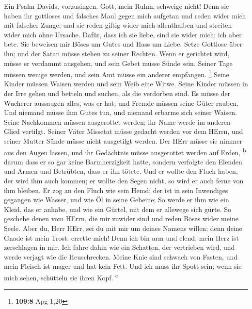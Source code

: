  Ein Psalm Davids, vorzusingen. Gott, mein Ruhm, schweige
nicht!  Denn sie haben ihr gottloses und falsches Maul
gegen mich aufgetan und reden wider mich mit falscher Zunge;
 und sie reden giftig wider mich allenthalben und streiten
wider mich ohne Ursache.  Dafür, dass ich sie liebe, sind
sie wider mich; ich aber bete.  Sie beweisen mir Böses um
Gutes und Hass um Liebe.  Setze Gottlose über ihn; und der
Satan müsse stehen zu seiner Rechten.  Wenn er gerichtet
wird, müsse er verdammt ausgehen, und sein Gebet müsse Sünde sein.
 Seiner Tage müssen wenige werden, und sein Amt müsse ein
anderer empfangen. \footnote{\textbf{109:8} Apg 1,20} 
Seine Kinder müssen Waisen werden und sein Weib eine Witwe.
 Seine Kinder müssen in der Irre gehen und betteln und
suchen, als die verdorben sind.  Es müsse der Wucherer
aussaugen alles, was er hat; und Fremde müssen seine Güter rauben.
 Und niemand müsse ihm Gutes tun, und niemand erbarme
sich seiner Waisen.  Seine Nachkommen müssen ausgerottet
werden; ihr Name werde im anderen Glied vertilgt.  Seiner
Väter Missetat müsse gedacht werden vor dem HErrn, und seiner Mutter
Sünde müsse nicht ausgetilgt werden.  Der HErr müsse sie
nimmer aus den Augen lassen, und ihr Gedächtnis müsse ausgerottet werden
auf Erden, \textsuperscript{b}  darum dass er so gar
keine Barmherzigkeit hatte, sondern verfolgte den Elenden und Armen und
Betrübten, dass er ihn tötete.  Und er wollte den Fluch
haben, der wird ihm auch kommen; er wollte den Segen nicht, so wird er
auch ferne von ihm bleiben.  Er zog an den Fluch wie sein
Hemd; der ist in sein Inwendiges gegangen wie Wasser, und wie Öl in
seine Gebeine;  So werde er ihm wie ein Kleid, das er
anhabe, und wie ein Gürtel, mit dem er allewege sich gürte.
 So geschehe denen vom HErrn, die mir zuwider sind und
reden Böses wider meine Seele.  Aber du, Herr HErr, sei
du mit mir um deines Namens willen; denn deine Gnade ist mein Trost:
errette mich!  Denn ich bin arm und elend; mein Herz ist
zerschlagen in mir.  Ich fahre dahin wie ein Schatten,
der vertrieben wird, und werde verjagt wie die Heuschrecken.
 Meine Knie sind schwach von Fasten, und mein Fleisch ist
mager und hat kein Fett.  Und ich muss ihr Spott sein;
wenn sie mich sehen, schütteln sie ihren Kopf. \textsuperscript{c}
